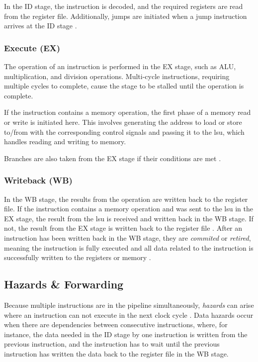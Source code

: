 In the ID stage, the instruction is decoded, and the required registers are read from the register file. Additionally, jumps are initiated when a jump instruction arrives at the ID stage \cite{openhwgroupPipelineDetailsCOREV2023}. 

\subsubsection{Execute (EX)}

The operation of an instruction is performed in the EX stage, such as ALU, multiplication, and division operations. Multi-cycle instructions, requiring multiple cycles to complete, cause the stage to be stalled until the operation is complete.

If the instruction contains a memory operation, the first phase of a memory read or write is initiated here. This involves generating the address to load or store to/from with the corresponding control signals and passing it to the \acrlong{lsu}, which handles reading and writing to memory.

Branches are also taken from the EX stage if their conditions are met \cite{openhwgroupPipelineDetailsCOREV2023}.

\subsubsection{Writeback (WB)}

In the WB stage, the results from the operation are written back to the register file. 
If the instruction contains a memory operation and was sent to the \acrshort{lsu} in the EX stage, the result from the \acrshort{lsu} is received and written back in the WB stage. If not, the result from the EX stage is written back to the register file \cite{openhwgroupPipelineDetailsCOREV2023}.
After an instruction has been written back in the WB stage, they are \textit{commited} or \textit{retired}, meaning the instruction is fully executed and all data related to the instruction is successfully written to the registers or memory \cite{taylorAdvancedRISCVVerification2023}. 


\subsection{Hazards \& Forwarding}

Because multiple instructions are in the pipeline simultaneously, \textit{hazards} can arise where an instruction can not execute in the next clock cycle \cite{pattersonComputerOrganizationDesign2021}. Data hazards occur when there are dependencies between consecutive instructions, where, for instance, the data needed in the ID stage by one instruction is written from the previous instruction, and the instruction has to wait until the previous instruction has written the data back to the register file in the WB stage.

